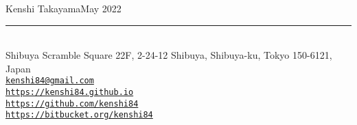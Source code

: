 {\Large\sc Kenshi Takayama}\hfill May 2022
\rule{\textwidth}{1pt}\\
{\small
Shibuya Scramble Square 22F, 2-24-12 Shibuya, Shibuya-ku, Tokyo 150-6121, Japan\\
\href{mailto:kenshi84@gmail.com}{{\tt kenshi84@gmail.com}}\\
\href{https://kenshi84.github.io}{{\tt https://kenshi84.github.io}}\\
\href{https://github.com/kenshi84}{{\tt https://github.com/kenshi84}}\\
\href{https://bitbucket.org/kenshi84}{{\tt https://bitbucket.org/kenshi84}}
}
\vspace{2mm}
